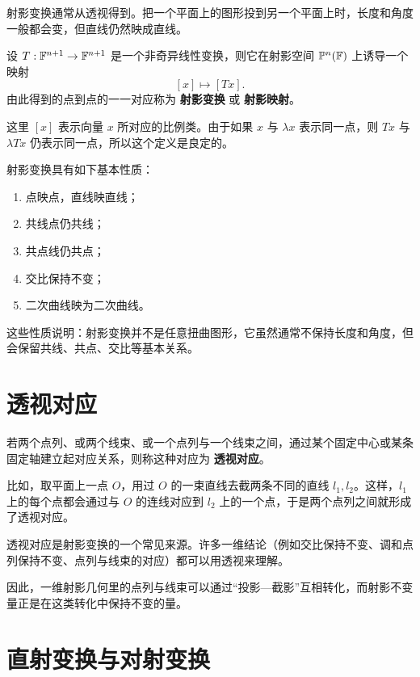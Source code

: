 射影变换通常从透视得到。把一个平面上的图形投到另一个平面上时，长度和角度一般都会变，但直线仍然映成直线。

\begin{definition}
设 $T:\mathbb{F}^{n+1}\to\mathbb{F}^{n+1}$ 是一个非奇异线性变换，则它在射影空间 $\mathbb{P}^n(\mathbb{F})$ 上诱导一个映射
\[
[x]\longmapsto [Tx].
\]
由此得到的点到点的一一对应称为 \textbf{射影变换} 或 \textbf{射影映射}。
\end{definition}

这里 $[x]$ 表示向量 $x$ 所对应的比例类。由于如果 $x$ 与 $\lambda x$ 表示同一点，则 $Tx$ 与 $\lambda Tx$ 仍表示同一点，所以这个定义是良定的。

\begin{property}
射影变换具有如下基本性质：
\begin{enumerate}
    \item 点映点，直线映直线；
    \item 共线点仍共线；
    \item 共点线仍共点；
    \item 交比保持不变；
    \item 二次曲线映为二次曲线。
\end{enumerate}
\end{property}

这些性质说明：射影变换并不是任意扭曲图形，它虽然通常不保持长度和角度，但会保留共线、共点、交比等基本关系。

\section{透视对应}
\begin{definition}
若两个点列、或两个线束、或一个点列与一个线束之间，通过某个固定中心或某条固定轴建立起对应关系，则称这种对应为 \textbf{透视对应}。
\end{definition}

比如，取平面上一点 $O$，用过 $O$ 的一束直线去截两条不同的直线 $l_1,l_2$。这样，$l_1$ 上的每个点都会通过与 $O$ 的连线对应到 $l_2$ 上的一个点，于是两个点列之间就形成了透视对应。

透视对应是射影变换的一个常见来源。许多一维结论（例如交比保持不变、调和点列保持不变、点列与线束的对应）都可以用透视来理解。

\begin{conclusion}
因此，一维射影几何里的点列与线束可以通过“投影—截影”互相转化，而射影不变量正是在这类转化中保持不变的量。
\end{conclusion}

\section{直射变换与对射变换}

